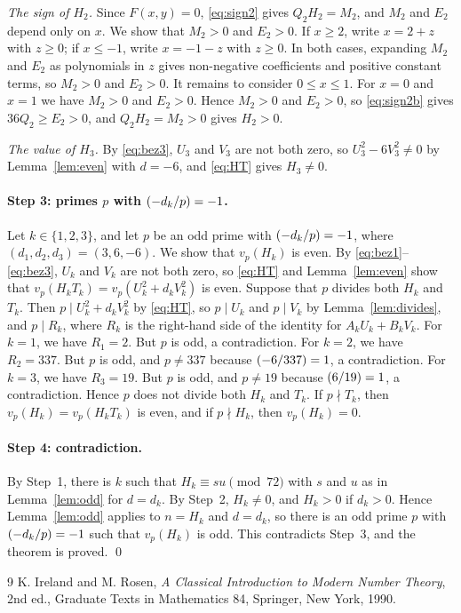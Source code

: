 \documentclass[11pt]{article}
\newcommand{\leg}[2]{\mathchoice{\biggl(\dfrac{#1}{#2}\biggr)}{(#1/#2)}{(#1/#2)}{(#1/#2)}}
\begin{document}
\emph{The sign of $H_{2}$.} Since $F(x,y)=0$, \eqref{eq:sign2} gives $Q_{2}H_{2}=M_{2}$, and $M_{2}$ and $E_{2}$ depend only on $x$. We show that $M_{2}>0$ and $E_{2}>0$. If $x\geq2$, write $x=2+z$ with $z\geq0$; if $x\leq-1$, write $x=-1-z$ with $z\geq0$. In both cases, expanding $M_{2}$ and $E_{2}$ as polynomials in $z$ gives non-negative coefficients and positive constant terms, so $M_{2}>0$ and $E_{2}>0$. It remains to consider $0\leq x\leq1$. For $x=0$ and $x=1$ we have $M_{2}>0$ and $E_{2}>0$. Hence $M_{2}>0$ and $E_{2}>0$, so \eqref{eq:sign2b} gives $36Q_{2}\geq E_{2}>0$, and $Q_{2}H_{2}=M_{2}>0$ gives $H_{2}>0$.

\emph{The value of $H_{3}$.} By \eqref{eq:bez3}, $U_{3}$ and $V_{3}$ are not both zero, so $U_{3}^2-6V_{3}^2\neq0$ by Lemma~\ref{lem:even} with $d=-6$, and \eqref{eq:HT} gives $H_{3}\neq0$.

\paragraph{Step 3: primes $p$ with $\leg{-d_k}{p}=-1$.} Let $k\in\{1,2,3\}$, and let $p$ be an odd prime with $\leg{-d_k}{p}=-1$, where $(d_{1},d_{2},d_{3})=(3,6,-6)$. We show that $v_p(H_k)$ is even. By \eqref{eq:bez1}--\eqref{eq:bez3}, $U_k$ and $V_k$ are not both zero, so \eqref{eq:HT} and Lemma~\ref{lem:even} show that $v_p(H_kT_k)=v_p(U_k^2+d_kV_k^2)$ is even. Suppose that $p$ divides both $H_k$ and $T_k$. Then $p\mid U_k^2+d_kV_k^2$ by \eqref{eq:HT}, so $p\mid U_k$ and $p\mid V_k$ by Lemma~\ref{lem:divides}, and $p\mid R_k$, where $R_k$ is the right-hand side of the identity for $A_kU_k+B_kV_k$. For $k=1$, we have $R_{1}=2$. But $p$ is odd, a contradiction. For $k=2$, we have $R_{2}=337$. But $p$ is odd, and $p\neq337$ because $\leg{-6}{337}=1$, a contradiction. For $k=3$, we have $R_{3}=19$. But $p$ is odd, and $p\neq19$ because $\leg{6}{19}=1$, a contradiction. Hence $p$ does not divide both $H_k$ and $T_k$. If $p\nmid T_k$, then $v_p(H_k)=v_p(H_kT_k)$ is even, and if $p\nmid H_k$, then $v_p(H_k)=0$.

\paragraph{Step 4: contradiction.} By Step~1, there is $k$ such that $H_k\equiv su\pmod{72}$ with $s$ and $u$ as in Lemma~\ref{lem:odd} for $d=d_k$. By Step~2, $H_k\neq0$, and $H_k>0$ if $d_k>0$. Hence Lemma~\ref{lem:odd} applies to $n=H_k$ and $d=d_k$, so there is an odd prime $p$ with $\leg{-d_k}{p}=-1$ such that $v_p(H_k)$ is odd. This contradicts Step~3, and the theorem is proved.
\qed

\begin{thebibliography}{9}
 K. Ireland and M. Rosen, \emph{A Classical Introduction to Modern Number Theory}, 2nd ed., Graduate Texts in Mathematics 84, Springer, New York, 1990.
\end{thebibliography}
\end{document}
